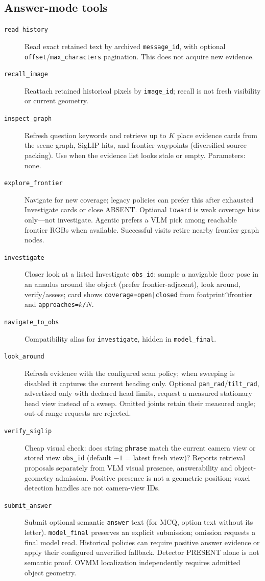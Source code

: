 \subsection{Answer-mode tools}

\begin{description}
  \item[\texttt{read\_history}] Read exact retained text by archived
    \texttt{message\_id}, with optional \texttt{offset}/\texttt{max\_characters}
    pagination. This does not acquire new evidence.
  \item[\texttt{recall\_image}] Reattach retained historical pixels by
    \texttt{image\_id}; recall is not fresh visibility or current geometry.
  \item[\texttt{inspect\_graph}] Refresh question keywords and retrieve up to $K$ place evidence cards from the scene graph, SigLIP hits, and frontier waypoints (diversified source packing).
    Use when the evidence list looks stale or empty.
    Parameters: none.
  \item[\texttt{explore\_frontier}] Navigate for new coverage; legacy policies can prefer this after exhausted Investigate cards or close ABSENT.
    Optional \texttt{toward} is weak coverage bias only---not investigate.
    Agentic prefers a VLM pick among reachable frontier RGBs when available.
    Successful visits retire nearby frontier graph nodes.
  \item[\texttt{investigate}] Closer look at a listed Investigate \texttt{obs\_id}: sample a navigable floor pose in an annulus around the object (prefer frontier-adjacent), look around, verify/assess; card shows \texttt{coverage=open|closed} from footprint$\cap$frontier and \texttt{approaches=$k$/$N$}.
  \item[\texttt{navigate\_to\_obs}] Compatibility alias for \texttt{investigate}, hidden in \texttt{model\_final}.
  \item[\texttt{look\_around}] Refresh evidence with the configured scan policy;
    when sweeping is disabled it captures the current heading only. Optional
    \texttt{pan\_rad}/\texttt{tilt\_rad}, advertised only with declared head
    limits, request a measured stationary head view instead of a sweep. Omitted
    joints retain their measured angle; out-of-range requests are rejected.
  \item[\texttt{verify\_siglip}] Cheap visual check: does string \texttt{phrase} match the current camera view or stored view \texttt{obs\_id} (default $-1$ = latest fresh view)?
    Reports retrieval proposals separately from VLM visual presence, answerability
    and object-geometry admission. Positive presence is not a geometric position;
    voxel detection handles are not camera-view IDs.
  \item[\texttt{submit\_answer}] Submit optional semantic \texttt{answer} text
    (for MCQ, option text without its letter). \texttt{model\_final} preserves an
    explicit submission; omission requests a final model read. Historical policies
    can require positive answer evidence or apply their configured unverified
    fallback. Detector PRESENT alone is not semantic proof. OVMM localization
    independently requires admitted object geometry.
\end{description}

